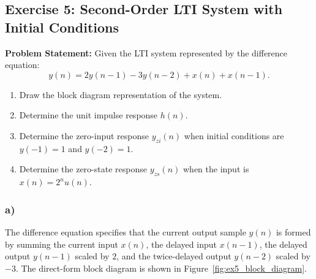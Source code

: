 \documentclass[12pt,a4paper]{article}
\begin{document}
\subsection{Exercise 5: Second-Order LTI System with Initial Conditions}
\textbf{Problem Statement:} Given the LTI system represented by the difference equation:
\begin{equation}
    y(n) = 2y(n-1) - 3y(n-2) + x(n) + x(n-1).
    \label{eq:ex5_diff}
\end{equation}
\begin{enumerate}[label=(\alph*)]
    \item Draw the block diagram representation of the system.
    \item Determine the unit impulse response $h(n)$.
    \item Determine the zero-input response $y_{zi}(n)$ when initial conditions are $y(-1) = 1$ and $y(-2) = 1$.
    \item Determine the zero-state response $y_{zs}(n)$ when the input is $x(n) = 2^n u(n)$.
\end{enumerate}

\subsubsection*{a)}
The difference equation specifies that the current output sample $y(n)$ is formed by summing the current input $x(n)$, the delayed input $x(n-1)$, the delayed output $y(n-1)$ scaled by $2$, and the twice-delayed output $y(n-2)$ scaled by $-3$. The direct-form block diagram is shown in Figure~\ref{fig:ex5_block_diagram}.
\end{document}
